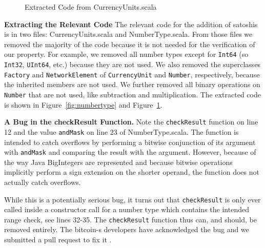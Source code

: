 \documentclass[runningheads]{llncs}
\renewcommand{\paragraph}{\textbf}%
\begin{document}
\begin{figure}

  \caption{Extracted Code from CurrencyUnits.scala}
  \label{fig:currencyunits}
\end{figure}

\paragraph{Extracting the Relevant Code} The relevant code for the
addition of satoshis is in two files: CurrencyUnits.scala and
NumberType.scala. From those files we removed the majority of the code
because it is not needed for the verification of our property. For
example, we removed all number types except for \texttt{Int64} (so
\texttt{Int32}, \texttt{UInt64}, etc.) because they are not used. We
also removed the superclasses \texttt{Factory} and
\texttt{NetworkElement} of \texttt{CurrencyUnit} and \texttt{Number},
respectively, because the inherited members are not used. We further
removed all binary operations on \texttt{Number} that are not used,
like subtraction and multiplication. The extracted code is shown in
Figure~\ref{fig:numbertype} and Figure~\ref{fig:currencyunits}.

\paragraph{A Bug in the checkResult Function.} Note the
\texttt{checkResult} function on line 12 and the value
\texttt{andMask} on line 23 of NumberType.scala. The function is
intended to catch overflows by performing a bitwise conjunction of its
argument with \texttt{andMask} and comparing the result with the
argument. However, because of the way Java BigIntegers are represented
\cite{wikipedia:twocomp} and because bitwise operations implicitly
perform a sign extension \cite{java:bigint} on the shorter operand,
the function does not actually catch overflows.

While this is a potentially serious bug, it turns out that
\texttt{checkResult} is only ever called inside a constructor call for
a number type which contains the intended range check, see lines
32-35. The \texttt{checkResult} function thus can, and should, be
removed entirely. The bitcoin-s developers have acknowledged the bug
and we submitted a pull request to fix it \cite{BitcoinS:pull565}.

\end{document}
